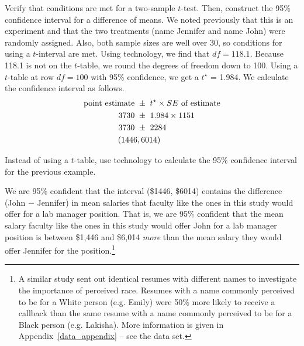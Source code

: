 \begin{examplewrap}
\begin{nexample}{Verify that conditions are met for a two-sample $t$-test.  Then, construct the 95\% confidence interval for a difference of means.}
We noted previously that this is an experiment and that the two treatments (name Jennifer and name John) were randomly assigned.  Also, both sample sizes are well over 30, so conditions for using a $t$-interval are met.  Using technology, we find that $df= 118.1$.  Because 118.1 is not on the $t$-table, we round the degrees of freedom down to 100.  Using a $t$-table at row $df=100$ with 95\% confidence, we get a $t^{\star}$ = 1.984. We calculate the confidence interval as follows. 
\begin{align*}
\text{point estimate } &\pm \ t^{\star}\times SE \text{ of estimate}\\
3730\ &\pm \ 1.984\times 1151{}\\
 3730\ &\pm \ 2284\\
(1446&, 6014)
\end{align*}
\end{nexample}
\end{examplewrap}

\begin{exercisewrap}
\begin{nexercise}
Instead of using a $t$-table, use technology to calculate the 95\% confidence interval for the previous example.\footnotemark
\end{nexercise}
\end{exercisewrap}

\newpage
We are 95\% confident that the interval (\$1446, \$6014) contains the difference (John $-$ Jennifer) in mean salaries that faculty like the ones in this study would offer for a lab manager position.  That is, we are 95\% confident that the mean salary faculty like the ones in this study would offer John for a lab manager position is between \$1,446 and \$6,014 \emph{more} than the mean salary they would offer Jennifer for the position.\footnote{A similar study sent out identical resumes with different names to investigate the importance of perceived race.  Resumes with a name commonly perceived to be for a White person (e.g. Emily) were 50\% more likely to receive a callback than the same resume with a name commonly perceived to be for a Black person (e.g. Lakisha). More information is given in Appendix~\ref{data_appendix} -- see the  data set.}   

